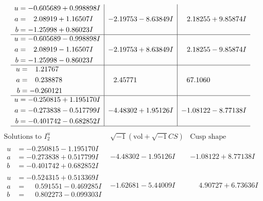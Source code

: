 \documentclass[1p]{elsarticle_modified}
\theoremstyle{definition}
\newcommand{\I}{\sqrt{-1}}
\begin{document}
$$\begin{array}{c|c|c}
\begin{aligned}
u &= -0.605689 + 0.998898 I \\
a &= \phantom{-}2.08919 + 1.16507 I \\
b &= -1.25998 + 0.86023 I\end{aligned}
 & -2.19753 - 8.63849 I & \phantom{-}2.18255 + 9.85874 I \\ \hline\begin{aligned}
u &= -0.605689 - 0.998898 I \\
a &= \phantom{-}2.08919 - 1.16507 I \\
b &= -1.25998 - 0.86023 I\end{aligned}
 & -2.19753 + 8.63849 I & \phantom{-}2.18255 - 9.85874 I \\ \hline\begin{aligned}
u &= \phantom{-}1.21767\phantom{ +0.000000I} \\
a &= \phantom{-}0.238878\phantom{ +0.000000I} \\
b &= -0.260121\phantom{ +0.000000I}\end{aligned}
 & \phantom{-}2.45771\phantom{ +0.000000I} & \phantom{-}67.1060\phantom{ +0.000000I} \\ \hline\begin{aligned}
u &= -0.250815 + 1.195170 I \\
a &= -0.273838 - 0.517799 I \\
b &= -0.401742 - 0.682852 I\end{aligned}
 & -4.48302 + 1.95126 I & -1.08122 - 8.77138 I\\
 \hline 
 \end{array}$$\newpage$$\begin{array}{c|c|c}  
\text{Solutions to }I^u_{2}& \I (\text{vol} + \sqrt{-1}CS) & \text{Cusp shape}\\
 \hline 
\begin{aligned}
u &= -0.250815 - 1.195170 I \\
a &= -0.273838 + 0.517799 I \\
b &= -0.401742 + 0.682852 I\end{aligned}
 & -4.48302 - 1.95126 I & -1.08122 + 8.77138 I \\ \hline\begin{aligned}
u &= -0.524315 + 0.513369 I \\
a &= \phantom{-}0.591551 - 0.469285 I \\
b &= \phantom{-}0.802273 - 0.099303 I\end{aligned}
 & -1.62681 - 5.44009 I & \phantom{-}4.90727 + 6.73636 I \\ \hline\begin{aligned}

\end{aligned}
\end{array}$$
\end{document}
